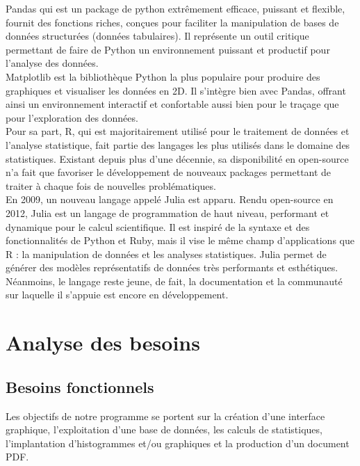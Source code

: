 \documentclass[a4paper]{report}
\begin{document}
Pandas qui est un package de python extrêmement efficace, puissant et flexible, fournit des fonctions riches, conçues pour faciliter la manipulation de bases de données structurées (données tabulaires)\cite{ref26}. Il représente un outil critique permettant de faire de Python un environnement puissant et productif pour l'analyse des données. \\

Matplotlib est la bibliothèque Python la plus populaire pour produire des graphiques et visualiser les données en 2D. Il s'intègre bien avec Pandas, offrant ainsi un environnement interactif et confortable aussi bien pour le traçage que pour l'exploration des données. \\

Pour sa part, R\cite{ref4}, qui est majoritairement utilisé pour le traitement de données et l’analyse statistique, fait partie des langages les plus utilisés dans le domaine des statistiques. Existant depuis plus d'une décennie, sa disponibilité en open-source n'a fait que favoriser le développement de nouveaux packages permettant de traiter à chaque fois de nouvelles problématiques.\\

En 2009, un nouveau langage appelé Julia\cite{ref6} est apparu. Rendu open-source en 2012, Julia est un langage de programmation de haut niveau, performant et dynamique pour le calcul scientifique. Il est inspiré de la syntaxe et des fonctionnalités de Python et Ruby, mais il vise le même champ d'applications que R : la manipulation de données et les analyses statistiques. Julia permet de générer des modèles représentatifs de données très performants et esthétiques. Néanmoins, le langage reste jeune, de fait, la documentation et la communauté sur laquelle il s'appuie est encore en développement. 


\section{Analyse des besoins}

\subsection{Besoins fonctionnels}
Les objectifs de notre programme se portent sur la création d'une interface graphique, l'exploitation d'une base de données, les calculs de statistiques, l'implantation d'histogrammes et/ou graphiques et la production d'un document PDF.\\
\end{document}
